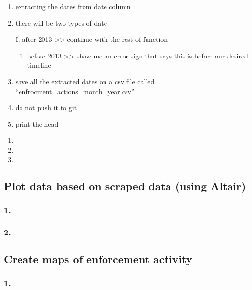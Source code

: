 \documentclass[
  letterpaper,
  DIV=11,
  numbers=noendperiod]{scrartcl}
\providecommand{\tightlist}{%
  \setlength{\itemsep}{0pt}\setlength{\parskip}{0pt}}\usepackage{longtable,booktabs,array}
\begin{document}
\begin{enumerate}
\def\labelenumi{\arabic{enumi}.}
\setcounter{enumi}{1}
\item
  extracting the dates from date column
\item
  there will be two types of date

  I. after 2013 \textgreater\textgreater{} continue with the rest of
  function

  \begin{enumerate}
  \def\labelenumii{\Roman{enumii}.}
  \setcounter{enumii}{1}
  \tightlist
  \item
    before 2013 \textgreater\textgreater{} show me an error sign that
    says this is before our desired timeline
  \end{enumerate}
\item
  save all the extracted dates on a csv file called
  ``enfrocment\_actions\_month\_year.csv''
\item
  do not push it to git
\item
  print the head
\end{enumerate}

\begin{enumerate}
\def\labelenumi{\alph{enumi}.}
\tightlist
\item
\item
\item
\end{enumerate}

\subsection{Plot data based on scraped data (using
Altair)}\label{plot-data-based-on-scraped-data-using-altair}

\subsubsection{1.}\label{section-3}

\subsubsection{2.}\label{section-4}

\subsection{Create maps of enforcement
activity}\label{create-maps-of-enforcement-activity}

\subsubsection{1.}\label{section-5}
\end{document}
